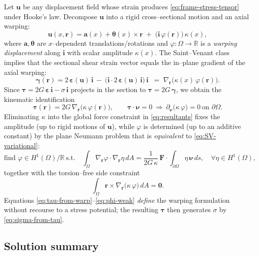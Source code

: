 Let $\bm{u}$ be any displacement field whose strain produces \eqref{eq:frame-stress-tensor} under Hooke's law. 
Decompose $\bm{u}$ into a rigid cross–sectional motion and an axial warping:
\[
\bm{u}(x,\bm{r})=\bm{a}(x)+\bm{\theta}(x)\times\bm{r}\;+\;\big(\mathbf{i}\,\varphi(\bm{r})\big)\,\kappa(x),
\]
where $\bm{a},\bm{\theta}$ are $x$–dependent translations/rotations and $\varphi:\Omega\to\mathbb{R}$ is a \emph{warping displacement} along $\mathbf{i}$ with scalar amplitude $\kappa(x)$. 
The Saint–Venant class implies that the sectional shear strain vector equals the in–plane gradient of the axial warping:
\[
\bm{\gamma}(\bm{r})=2\,\bm{\varepsilon}(\bm{u})\,\mathbf{i}\ -\ \big(\mathbf{i}\cdot 2\,\bm{\varepsilon}(\bm{u})\,\mathbf{i}\big)\,\mathbf{i}
\;\;=\;\nabla_{\bm{r}}\big(\kappa(x)\,\varphi(\bm{r})\big).
\]
Since $\bm{\tau}=2G\,\bm{\varepsilon}\,\mathbf{i}-\sigma\,\mathbf{i}$ projects in the section to $\bm{\tau}=2G\,\bm{\gamma}$, we obtain the kinematic identification
\begin{equation}
\bm{\tau}(\bm{r})=2G\,\nabla_{\bm{r}}\big(\kappa\,\varphi(\bm{r})\big),
\qquad 
\bm{\tau}\cdot\bm{\nu}=0\ \Rightarrow\ \partial_{\bm{\nu}}\big(\kappa\,\varphi\big)=0\ \text{on }\partial\Omega.
\label{eq:tau-from-warp}
\end{equation}
Eliminating $\kappa$ into the global force constraint in \eqref{eq:resultants} fixes the amplitude (up to rigid motions of $\bm{u}$), while $\varphi$ is determined (up to an additive constant) by the plane Neumann problem that is \emph{equivalent} to \eqref{eq:SV-variational}:
\begin{equation}
\text{find }\varphi\in H^1(\Omega)/\mathbb{R}\ \text{s.t.}\quad
\int_\Omega \nabla_{\bm{r}}\varphi\cdot\nabla_{\bm{r}}\eta\,dA
=\frac{1}{2G\,\kappa}\,\bm{F}\cdot\int_{\partial\Omega}\eta\,\bm{\nu}\,ds,
\quad\forall\eta\in H^1(\Omega),
\label{eq:phi-weak}
\end{equation}
together with the torsion–free side constraint
\begin{equation}
\int_\Omega \bm{r}\times\nabla_{\bm{r}}\big(\kappa\,\varphi\big)\,dA=\mathbf{0}.
\label{eq:phi-tf}
\end{equation}
Equations \eqref{eq:tau-from-warp}–\eqref{eq:phi-weak} \emph{define} the warping formulation without recourse to a stress potential; the resulting $\bm{\tau}$ then generates $\sigma$ by \eqref{eq:sigma-from-tau}.

\subsection*{Solution summary}

